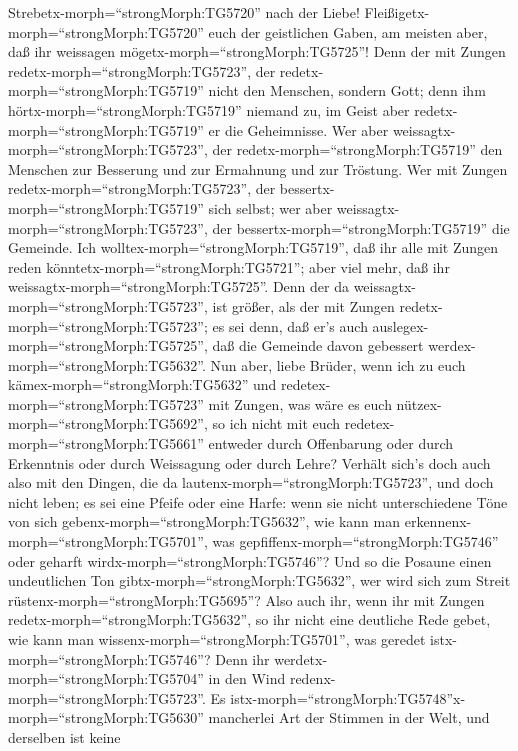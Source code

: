  Strebetx-morph=``strongMorph:TG5720'' nach der Liebe!
Fleißigetx-morph=``strongMorph:TG5720'' euch der geistlichen Gaben, am
meisten aber, daß ihr weissagen mögetx-morph=``strongMorph:TG5725''!
 Denn der mit Zungen redetx-morph=``strongMorph:TG5723'',
der redetx-morph=``strongMorph:TG5719'' nicht den Menschen, sondern
Gott; denn ihm hörtx-morph=``strongMorph:TG5719'' niemand zu, im Geist
aber redetx-morph=``strongMorph:TG5719'' er die Geheimnisse.
 Wer aber weissagtx-morph=``strongMorph:TG5723'', der
redetx-morph=``strongMorph:TG5719'' den Menschen zur Besserung und zur
Ermahnung und zur Tröstung.  Wer mit Zungen
redetx-morph=``strongMorph:TG5723'', der
bessertx-morph=``strongMorph:TG5719'' sich selbst; wer aber
weissagtx-morph=``strongMorph:TG5723'', der
bessertx-morph=``strongMorph:TG5719'' die Gemeinde.  Ich
wolltex-morph=``strongMorph:TG5719'', daß ihr alle mit Zungen reden
könntetx-morph=``strongMorph:TG5721''; aber viel mehr, daß ihr
weissagtx-morph=``strongMorph:TG5725''. Denn der da
weissagtx-morph=``strongMorph:TG5723'', ist größer, als der mit Zungen
redetx-morph=``strongMorph:TG5723''; es sei denn, daß er's auch
auslegex-morph=``strongMorph:TG5725'', daß die Gemeinde davon gebessert
werdex-morph=``strongMorph:TG5632''.  Nun aber, liebe
Brüder, wenn ich zu euch kämex-morph=``strongMorph:TG5632'' und
redetex-morph=``strongMorph:TG5723'' mit Zungen, was wäre es euch
nützex-morph=``strongMorph:TG5692'', so ich nicht mit euch
redetex-morph=``strongMorph:TG5661'' entweder durch Offenbarung oder
durch Erkenntnis oder durch Weissagung oder durch Lehre? 
Verhält sich's doch auch also mit den Dingen, die da
lautenx-morph=``strongMorph:TG5723'', und doch nicht leben; es sei eine
Pfeife oder eine Harfe: wenn sie nicht unterschiedene Töne von sich
gebenx-morph=``strongMorph:TG5632'', wie kann man
erkennenx-morph=``strongMorph:TG5701'', was
gepfiffenx-morph=``strongMorph:TG5746'' oder geharft
wirdx-morph=``strongMorph:TG5746''?  Und so die Posaune
einen undeutlichen Ton gibtx-morph=``strongMorph:TG5632'', wer wird sich
zum Streit rüstenx-morph=``strongMorph:TG5695''?  Also auch
ihr, wenn ihr mit Zungen redetx-morph=``strongMorph:TG5632'', so ihr
nicht eine deutliche Rede gebet, wie kann man
wissenx-morph=``strongMorph:TG5701'', was geredet
istx-morph=``strongMorph:TG5746''? Denn ihr
werdetx-morph=``strongMorph:TG5704'' in den Wind
redenx-morph=``strongMorph:TG5723''.  Es
istx-morph=``strongMorph:TG5748''x-morph=``strongMorph:TG5630''
mancherlei Art der Stimmen in der Welt, und derselben ist keine
